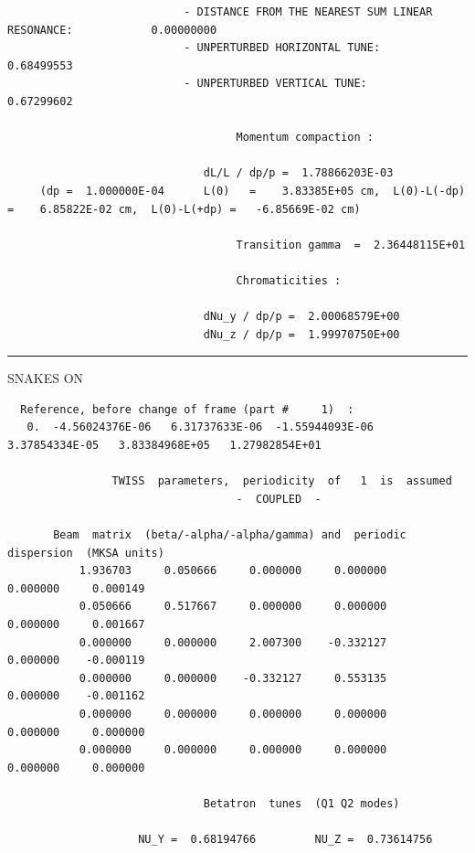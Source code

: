 \documentclass[10pt]{article}
\begin{document}
\begin{minipage}{1.\linewidth}
\begin{minipage}{.49\linewidth}
\begin{verbatim}
                           - DISTANCE FROM THE NEAREST SUM LINEAR RESONANCE:            0.00000000
                           - UNPERTURBED HORIZONTAL TUNE:                               0.68499553
                           - UNPERTURBED VERTICAL TUNE:                                 0.67299602

                                   Momentum compaction : 

                              dL/L / dp/p =  1.78866203E-03
     (dp =  1.000000E-04      L(0)   =    3.83385E+05 cm,  L(0)-L(-dp) =    6.85822E-02 cm,  L(0)-L(+dp) =   -6.85669E-02 cm) 

                                   Transition gamma  =  2.36448115E+01

                                   Chromaticities : 

                              dNu_y / dp/p =  2.00068579E+00
                              dNu_z / dp/p =  1.99970750E+00
\end{verbatim}
\end{minipage}
\begin{minipage}{.001\linewidth}
\rule{0.1mm}{11cm}
\end{minipage}
\begin{minipage}{.49\linewidth}
SNAKES ON

\tiny
\begin{verbatim}
  Reference, before change of frame (part #     1)  : 
   0.  -4.56024376E-06   6.31737633E-06  -1.55944093E-06   3.37854334E-05   3.83384968E+05   1.27982854E+01

                TWISS  parameters,  periodicity  of   1  is  assumed 
                                   -  COUPLED  -

       Beam  matrix  (beta/-alpha/-alpha/gamma) and  periodic  dispersion  (MKSA units)
           1.936703     0.050666     0.000000     0.000000     0.000000     0.000149
           0.050666     0.517667     0.000000     0.000000     0.000000     0.001667
           0.000000     0.000000     2.007300    -0.332127     0.000000    -0.000119
           0.000000     0.000000    -0.332127     0.553135     0.000000    -0.001162
           0.000000     0.000000     0.000000     0.000000     0.000000     0.000000
           0.000000     0.000000     0.000000     0.000000     0.000000     0.000000

                              Betatron  tunes  (Q1 Q2 modes)

                    NU_Y =  0.68194766         NU_Z =  0.73614756    



\end{verbatim}
\end{minipage}
\end{minipage}
\end{document}

